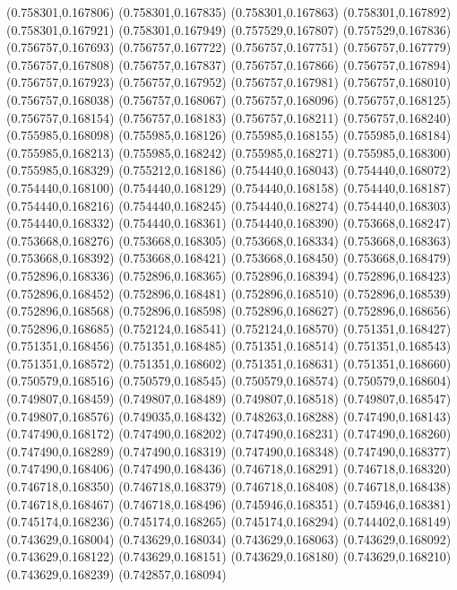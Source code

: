 (0.758301,0.167806)
(0.758301,0.167835)
(0.758301,0.167863)
(0.758301,0.167892)
(0.758301,0.167921)
(0.758301,0.167949)
(0.757529,0.167807)
(0.757529,0.167836)
(0.756757,0.167693)
(0.756757,0.167722)
(0.756757,0.167751)
(0.756757,0.167779)
(0.756757,0.167808)
(0.756757,0.167837)
(0.756757,0.167866)
(0.756757,0.167894)
(0.756757,0.167923)
(0.756757,0.167952)
(0.756757,0.167981)
(0.756757,0.168010)
(0.756757,0.168038)
(0.756757,0.168067)
(0.756757,0.168096)
(0.756757,0.168125)
(0.756757,0.168154)
(0.756757,0.168183)
(0.756757,0.168211)
(0.756757,0.168240)
(0.755985,0.168098)
(0.755985,0.168126)
(0.755985,0.168155)
(0.755985,0.168184)
(0.755985,0.168213)
(0.755985,0.168242)
(0.755985,0.168271)
(0.755985,0.168300)
(0.755985,0.168329)
(0.755212,0.168186)
(0.754440,0.168043)
(0.754440,0.168072)
(0.754440,0.168100)
(0.754440,0.168129)
(0.754440,0.168158)
(0.754440,0.168187)
(0.754440,0.168216)
(0.754440,0.168245)
(0.754440,0.168274)
(0.754440,0.168303)
(0.754440,0.168332)
(0.754440,0.168361)
(0.754440,0.168390)
(0.753668,0.168247)
(0.753668,0.168276)
(0.753668,0.168305)
(0.753668,0.168334)
(0.753668,0.168363)
(0.753668,0.168392)
(0.753668,0.168421)
(0.753668,0.168450)
(0.753668,0.168479)
(0.752896,0.168336)
(0.752896,0.168365)
(0.752896,0.168394)
(0.752896,0.168423)
(0.752896,0.168452)
(0.752896,0.168481)
(0.752896,0.168510)
(0.752896,0.168539)
(0.752896,0.168568)
(0.752896,0.168598)
(0.752896,0.168627)
(0.752896,0.168656)
(0.752896,0.168685)
(0.752124,0.168541)
(0.752124,0.168570)
(0.751351,0.168427)
(0.751351,0.168456)
(0.751351,0.168485)
(0.751351,0.168514)
(0.751351,0.168543)
(0.751351,0.168572)
(0.751351,0.168602)
(0.751351,0.168631)
(0.751351,0.168660)
(0.750579,0.168516)
(0.750579,0.168545)
(0.750579,0.168574)
(0.750579,0.168604)
(0.749807,0.168459)
(0.749807,0.168489)
(0.749807,0.168518)
(0.749807,0.168547)
(0.749807,0.168576)
(0.749035,0.168432)
(0.748263,0.168288)
(0.747490,0.168143)
(0.747490,0.168172)
(0.747490,0.168202)
(0.747490,0.168231)
(0.747490,0.168260)
(0.747490,0.168289)
(0.747490,0.168319)
(0.747490,0.168348)
(0.747490,0.168377)
(0.747490,0.168406)
(0.747490,0.168436)
(0.746718,0.168291)
(0.746718,0.168320)
(0.746718,0.168350)
(0.746718,0.168379)
(0.746718,0.168408)
(0.746718,0.168438)
(0.746718,0.168467)
(0.746718,0.168496)
(0.745946,0.168351)
(0.745946,0.168381)
(0.745174,0.168236)
(0.745174,0.168265)
(0.745174,0.168294)
(0.744402,0.168149)
(0.743629,0.168004)
(0.743629,0.168034)
(0.743629,0.168063)
(0.743629,0.168092)
(0.743629,0.168122)
(0.743629,0.168151)
(0.743629,0.168180)
(0.743629,0.168210)
(0.743629,0.168239)
(0.742857,0.168094)
